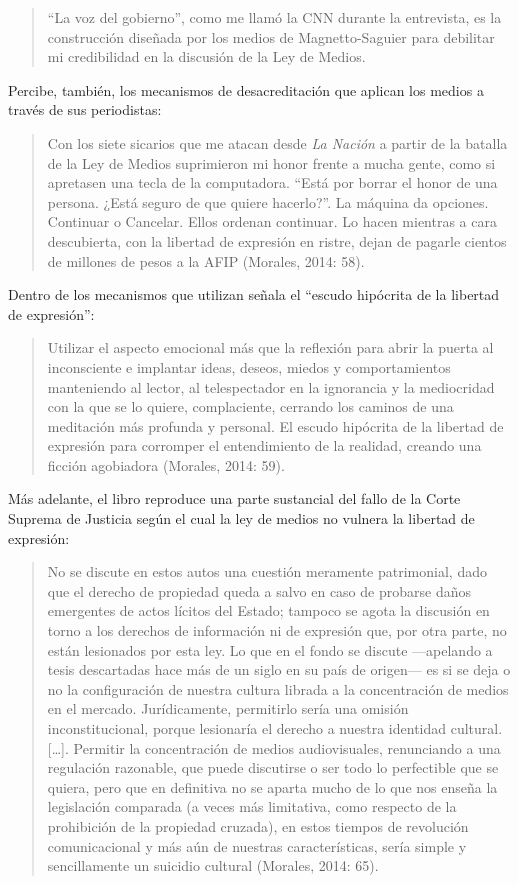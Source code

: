\begin{quote}
``La voz del gobierno'', como me llamó la CNN durante la entrevista, es la construcción diseñada por los medios de Magnetto-Saguier para debilitar mi credibilidad en la discusión de la Ley de Medios.
\end{quote}

Percibe, también, los mecanismos de desacreditación que aplican los medios a través de sus periodistas:

\begin{quote}
Con los siete sicarios que me atacan desde \emph{La Nación} a partir de la batalla de la Ley de Medios suprimieron mi honor frente a mucha gente, como si apretasen una tecla de la computadora. ``Está por borrar el honor de una persona. ¿Está seguro de que quiere hacerlo?''. La máquina da opciones. Continuar o Cancelar. Ellos ordenan continuar. Lo hacen mientras a cara descubierta, con la libertad de expresión en ristre, dejan de pagarle cientos de millones de pesos a la AFIP (Morales, 2014: 58).
\end{quote}

Dentro de los mecanismos que utilizan señala el ``escudo hipócrita de la libertad de expresión'':

\begin{quote}
Utilizar el aspecto emocional más que la reflexión para abrir la puerta al inconsciente e implantar ideas, deseos, miedos y comportamientos manteniendo al lector, al telespectador en la ignorancia y la mediocridad con la que se lo quiere, complaciente, cerrando los caminos de una meditación más profunda y personal. El escudo hipócrita de la libertad de expresión para corromper el entendimiento de la realidad, creando una ficción agobiadora (Morales, 2014: 59).
\end{quote}

Más adelante, el libro reproduce una parte sustancial del fallo de la Corte Suprema de Justicia según el cual la ley de medios no vulnera la libertad de expresión:

\begin{quote}
No se discute en estos autos una cuestión meramente patrimonial, dado que el derecho de propiedad queda a salvo en caso de probarse daños emergentes de actos lícitos del Estado; tampoco se agota la discusión en torno a los derechos de información ni de expresión que, por otra parte, no están lesionados por esta ley. Lo que en el fondo se discute ---apelando a tesis descartadas hace más de un siglo en su país de origen--- es si se deja o no la configuración de nuestra cultura librada a la concentración de medios en el mercado. Jurídicamente, permitirlo sería una omisión inconstitucional, porque lesionaría el derecho a nuestra identidad cultural.{[}\ldots{]}. Permitir la concentración de medios audiovisuales, renunciando a una regulación razonable, que puede discutirse o ser todo lo perfectible que se quiera, pero que en definitiva no se aparta mucho de lo que nos enseña la legislación comparada (a veces más limitativa, como respecto de la prohibición de la propiedad cruzada), en estos tiempos de revolución comunicacional y más aún de nuestras características, sería simple y sencillamente un suicidio cultural (Morales, 2014: 65).
\end{quote}

